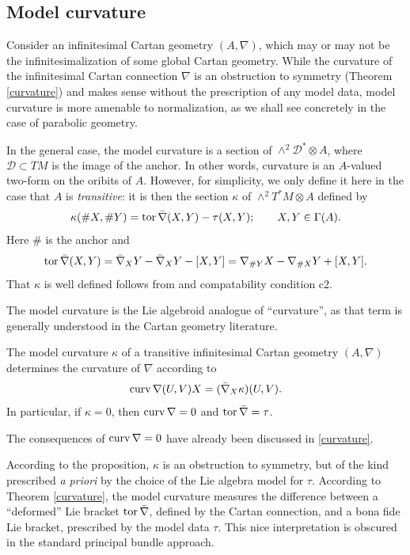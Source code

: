 \documentclass[leqno,12pt]{amsart} %
\begin{document}
\subsection{Model curvature}\label{model_curvature_general}
Consider an infinitesimal Cartan geometry $(A, \nabla)$, which may or may not be the
infinitesimalization of some global Cartan geometry. While the curvature of the
infinitesimal Cartan connection $\nabla$ is an obstruction to symmetry (Theorem
\ref{curvature}) and makes sense without the prescription of any model data, {\df model
  curvature} is more amenable to normalization, as we shall see concretely in the case of
parabolic geometry.

In the general case, the model curvature is a section of $\wedge^2{\mathcal D}^*\otimes A$,
where ${\mathcal D} \subset TM$ is the image of the anchor. In other words, curvature is
an $A$-valued two-form on the oribits of $A$.  However, for simplicity, we only define it
here in the case that $A$ is {\em transitive}: it is then the section $\kappa$ of
$\wedge^2 T^*\!M \otimes A$ defined by
\begin{equation*}
  \kappa(\#X, \#Y) = \operatorname{tor} \bar\nabla (X, Y) - \tau(X, Y); \qquad X, Y \in \Gamma(A).
\end{equation*}
Here $\#$ is the anchor and
$$\operatorname{tor} \bar\nabla(X, Y) = \bar\nabla_XY - \bar\nabla_XY - [X, Y] = \nabla_{\#Y} X -
\nabla_{\# X} Y + [X, Y].$$ That $\kappa $ is well defined follows from
 and compatability condition c2.

The model curvature is the Lie algebroid analogue of ``curvature'', as that term is
generally understood in the Cartan geometry literature.

\begin{proposition}
  The model curvature $\kappa $ of a transitive infinitesimal Cartan geometry
  $(A, \nabla)$ determines the curvature of $\nabla $ according to
  \begin{equation*}
    \operatorname{curv} \nabla (U, V)X = (\bar\nabla_X \kappa)(U, V).
  \end{equation*}
  In particular, if $\kappa =0$, then $\operatorname{curv} \nabla =0$ and
  $\operatorname{tor} \bar\nabla =\tau $.
\end{proposition}
\noindent The consequences of $\operatorname{curv} \nabla =0$ have already been discussed in
\ref{curvature}.

According to the proposition, $\kappa $ is an obstruction to symmetry, but of the kind
prescribed {\em a priori} by the choice of the Lie algebra model for $\tau $. According to
Theorem \ref{curvature}, the model curvature measures the difference between a
``deformed'' Lie bracket $\operatorname{tor} \bar\nabla$, defined by the Cartan connection, and a
bona fide Lie bracket, prescribed by the model data $\tau$. This nice interpretation is
obscured in the standard principal bundle approach.
\end{document}
